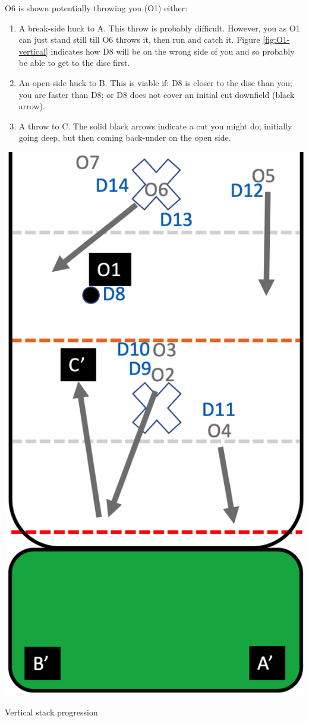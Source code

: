 \documentclass{tufte-handout}
\begin{document}
O6 is shown
potentially throwing 
you (O1) either:
\begin{enumerate}
\item A break-side 
huck to A.
This throw is 
probably 
difficult. 
However, you as O1
can just
stand still 
till O6 throws it, 
then run and catch it.
Figure \ref{fig:O1-vertical} indicates how 
D8 will be on the wrong side of you
and so probably 
be able to get to the disc
first.
\item An open-side huck to B. 
This is viable if: 
D8 is closer to the disc than you; 
you are faster than D8; or 
D8 does not cover 
an initial cut downfield (black arrow). 
\item A throw 
to C.
The solid black arrows indicate 
a cut you might do;
initially going deep,
but then coming back-under
on the open side.
\end{enumerate}

\begin{marginfigure}%
  \includegraphics[width=\linewidth]{O1-vertical2}
  \caption{Vertical stack progression}
  \label{fig:O1-vertical2}
\end{marginfigure}
\end{document}
